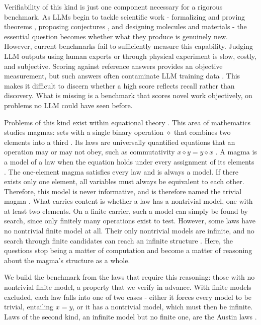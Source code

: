 \documentclass[letterpaper]{article} %
\newcommand{\op}{\diamond}
\begin{document}
Verifiability of this kind is just one component necessary for a rigorous benchmark. As LLMs begin to tackle scientific work - formalizing and proving theorems \citep{yang2023leandojo, xin2024deepseek}, proposing conjectures \citep{romera2024mathematical, gottweis2026accelerating, lu2024ai}, and designing molecules and materials \citep{jumper2021highly, merchant2023scaling} - the essential question becomes whether what they produce is genuinely new. However, current benchmarks fail to sufficiently measure this capability. Judging LLM outputs using human experts or through physical experiment is slow, costly, and subjective. Scoring against reference answers provides an objective measurement, but such answers often contaminate LLM training data \citep{xu2024benchmark, chen2025recent}. This makes it difficult to discern whether a high score reflects recall rather than discovery. What is missing is a benchmark that scores novel work objectively, on problems no LLM could have seen before. 


Problems of this kind exist within equational theory \citep{birkhoff1935structure}. This area of mathematics studies magmas: sets with a single binary operation $\op$ that combines two elements into a third \citep{burris1981course}. Its laws are universally quantified equations that an operation may or may not obey, such as commutativity $x \op y = y \op x$ \citep{burris1981course, baader1998term}. A magma is a model of a law when the equation holds under every assignment of its elements \citep{burris1981course}. The one-element magma satisfies every law and is always a model. If there exists only one element, all variables must always be equivalent to each other. Therefore, this model is never informative, and is therefore named the trivial magma \citep{burris1981course}. What carries content is whether a law has a nontrivial model, one with at least two elements. On a finite carrier, such a model can simply be found by search, since only finitely many operations exist to test. However, some laws have no nontrivial finite model at all. Their only nontrivial models are infinite, and no search through finite candidates can reach an infinite structure \citep{kisielewicz1997austin, bolan2025equational}. Here, the questions stop being a matter of computation and become a matter of reasoning about the magma's structure as a whole.

We build the benchmark from the laws that require this reasoning: those with no nontrivial finite model, a property that we verify in advance. With finite models excluded, each law falls into one of two cases - either it forces every model to be trivial, entailing $x = y$, or it has a nontrivial model, which must then be infinite. Laws of the second kind, an infinite model but no finite one, are the Austin laws \citep{kisielewicz1997austin}. 
\end{document}
